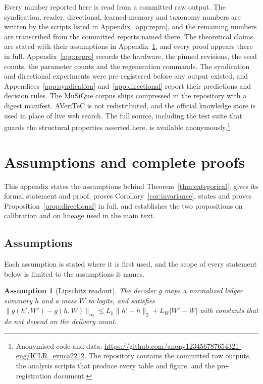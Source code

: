 \documentclass{article}
\newtheorem{assumption}{Assumption}
\begin{document}
Every number reported here is read from a committed raw output. The syndication,
reader, directional, learned-memory and taxonomy numbers are written by the
scripts listed in Appendix~\ref{app:repro}, and the remaining numbers are
transcribed from the committed reports named there. The theoretical claims are
stated with their assumptions in Appendix~\ref{app:theory}, and every proof
appears there in full. Appendix~\ref{app:repro} records the hardware, the pinned
revisions, the seed counts, the parameter counts and the regeneration commands.
The syndication and directional experiments were pre-registered before any
output existed, and Appendices~\ref{app:syndication} and~\ref{app:directional}
report their predictions and decision rules. The MuSiQue corpus ships compressed
in the repository with a digest manifest. AVeriTeC is not redistributed, and the
official knowledge store is used in place of live web search. The full source,
including the test suite that guards the structural properties asserted here, is
available anonymously.\footnote{Anonymised code and data:
\url{https://github.com/anony123456787654321-eng/ICLR_evnca2212}. The repository contains the committed
raw outputs, the analysis scripts that produce every table and figure, and the
pre-registration document.}

\label{endofstatements}



\clearpage
\appendix

\section{Assumptions and complete proofs}
\label{app:theory}

This appendix states the assumptions behind Theorem~\ref{thm:categorical},
gives its formal statement and proof, proves Corollary~\ref{cor:invariance},
states and proves Proposition~\ref{prop:directional} in full, and establishes
the two propositions on calibration and on lineage used in the main text.

\subsection{Assumptions}

Each assumption is stated where it is first used, and the scope of every
statement below is limited to the assumptions it names.

\begin{assumption}[Lipschitz readout]
\label{ass:readout}
The decoder $g$ maps a normalized ledger summary $h$ and a mass $W$ to logits,
and satisfies
$\|g(h',W')-g(h,W)\|_\infty\le L_h\|h'-h\|_2+L_W|W'-W|$ with constants that do
not depend on the delivery count.
\end{assumption}
\end{document}
